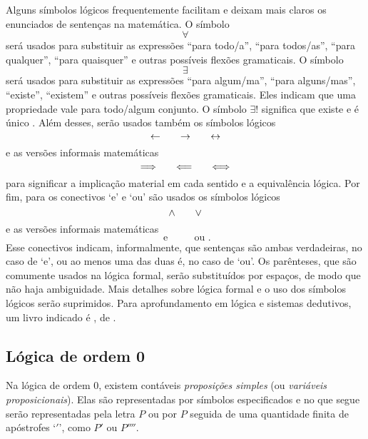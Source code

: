 Alguns símbolos lógicos frequentemente facilitam e deixam mais claros os enunciados de sentenças na matemática. O símbolo
	\begin{equation*}
	\forall
	\end{equation*}
será usados para substituir as expressões ``para todo/a'', ``para todos/as'', ``para qualquer'', ``para quaisquer'' e outras possíveis flexões gramaticais. O símbolo
	\begin{equation*}
	\exists
	\end{equation*}
será usados para substituir as expressões ``para algum/ma'', ``para alguns/mas'', ``existe'', ``existem'' e outras possíveis flexões gramaticais. Eles indicam que uma propriedade vale para todo/algum conjunto. O símbolo $\exists!$ significa que existe e é único%
. Além desses, serão usados também os símbolos lógicos
	\begin{equation*}
	\leftarrow \qquad \rightarrow \qquad \leftrightarrow
	\end{equation*}
e as versões informais matemáticas
	\begin{equation*}
	\quad \Longrightarrow \quad \quad \Longleftarrow \quad \quad \Longleftrightarrow \quad
	\end{equation*}
para significar a implicação material em cada sentido e a equivalência lógica. Por fim, para os conectivos `e' e `ou'  são usados os símbolos lógicos
	\begin{equation*}
	\land \qquad \lor
	\end{equation*}
e as versões informais matemáticas
	\begin{equation*}
	\text{\ \ e\ \ } \qquad \text{\ \ ou\ \ }.
	\end{equation*}
Esse conectivos indicam, informalmente, que sentenças são ambas verdadeiras, no caso de `e', ou ao menos uma das duas é, no caso de `ou'. Os parênteses, que são comumente usados na lógica formal, serão substituídos por espaços, de modo que não haja ambiguidade. Mais detalhes sobre lógica formal e o uso dos símbolos lógicos serão suprimidos. Para aprofundamento em lógica e sistemas dedutivos, um livro indicado é , de \citeauthor{liv:Tarski-IntroductionLogic}.


\subsection{Lógica de ordem 0}

Na lógica de ordem $0$, existem contáveis \emph{proposições simples} (ou \emph{variáveis proposicionais}). Elas são representadas por símbolos especificados e no que segue serão representadas pela letra $P$ ou por $P$ seguida de uma quantidade finita de apóstrofes `$'$', como $P'$ ou $P''''$.

